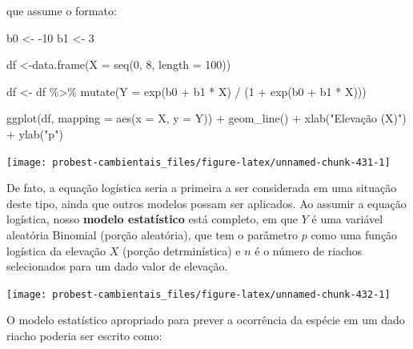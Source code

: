 \documentclass[
]{book}
\newenvironment{Shaded}{\begin{snugshade}}{\end{snugshade}}
\newcommand{\AttributeTok}[1]{\textcolor[rgb]{0.77,0.63,0.00}{#1}}
\newcommand{\DecValTok}[1]{\textcolor[rgb]{0.00,0.00,0.81}{#1}}
\newcommand{\FunctionTok}[1]{\textcolor[rgb]{0.00,0.00,0.00}{#1}}
\newcommand{\NormalTok}[1]{#1}
\newcommand{\OtherTok}[1]{\textcolor[rgb]{0.56,0.35,0.01}{#1}}
\newcommand{\SpecialCharTok}[1]{\textcolor[rgb]{0.00,0.00,0.00}{#1}}
\newcommand{\StringTok}[1]{\textcolor[rgb]{0.31,0.60,0.02}{#1}}
\begin{document}
que assume o formato:

\begin{Shaded}
\begin{Highlighting}[]
\NormalTok{b0 }\OtherTok{\textless{}{-}} \SpecialCharTok{{-}}\DecValTok{10}
\NormalTok{b1 }\OtherTok{\textless{}{-}} \DecValTok{3}

\NormalTok{df }\OtherTok{\textless{}{-}}\FunctionTok{data.frame}\NormalTok{(}\AttributeTok{X =} \FunctionTok{seq}\NormalTok{(}\DecValTok{0}\NormalTok{, }\DecValTok{8}\NormalTok{, }\AttributeTok{length =} \DecValTok{100}\NormalTok{))}

\NormalTok{df }\OtherTok{\textless{}{-}}\NormalTok{ df }\SpecialCharTok{\%\textgreater{}\%} \FunctionTok{mutate}\NormalTok{(}\AttributeTok{Y =} \FunctionTok{exp}\NormalTok{(b0 }\SpecialCharTok{+}\NormalTok{ b1 }\SpecialCharTok{*}\NormalTok{ X) }\SpecialCharTok{/}\NormalTok{ (}\DecValTok{1} \SpecialCharTok{+} \FunctionTok{exp}\NormalTok{(b0 }\SpecialCharTok{+}\NormalTok{ b1 }\SpecialCharTok{*}\NormalTok{ X)))}

\FunctionTok{ggplot}\NormalTok{(df, }\AttributeTok{mapping =} \FunctionTok{aes}\NormalTok{(}\AttributeTok{x =}\NormalTok{ X, }\AttributeTok{y =}\NormalTok{ Y)) }\SpecialCharTok{+}
  \FunctionTok{geom\_line}\NormalTok{() }\SpecialCharTok{+}
  \FunctionTok{xlab}\NormalTok{(}\StringTok{"Elevação (X)"}\NormalTok{) }\SpecialCharTok{+}
  \FunctionTok{ylab}\NormalTok{(}\StringTok{"p"}\NormalTok{)}
\end{Highlighting}
\end{Shaded}

\begin{center}\texttt{[image: probest-cambientais\_files/figure-latex/unnamed-chunk-431-1]} \end{center}

De fato, a equação logística seria a primeira a ser considerada em uma situação deste tipo, ainda que outros modelos possam ser aplicados. Ao assumir a equação logística, nosso \textbf{modelo estatístico} está completo, em que \(Y\) é uma variável aleatória Binomial (porção aleatória), que tem o parâmetro \(p\) como uma função logística da elevação \(X\) (porção detrminística) e \(n\) é o número de riachos selecionados para um dado valor de elevação.

\begin{center}\texttt{[image: probest-cambientais\_files/figure-latex/unnamed-chunk-432-1]} \end{center}

O modelo estatístico apropriado para prever a ocorrência da espécie em um dado riacho poderia ser escrito como:
\end{document}
